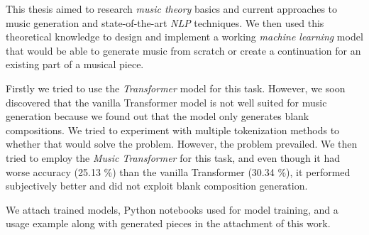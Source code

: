 

This thesis aimed to research \textit{music theory} basics and current approaches to music generation and state-of-the-art \textit{NLP} techniques.
We then used this theoretical knowledge to design and implement a working \textit{machine learning} model that would be able to generate music from scratch or create a continuation for an existing part of a musical piece.

Firstly we tried to use the \textit{Transformer} model for this task.
However, we soon discovered that the vanilla Transformer model is not well suited for music generation because we found out that the model only generates blank compositions.
We tried to experiment with multiple tokenization methods to whether that would solve the problem.
However, the problem prevailed.
We then tried to employ the \textit{Music Transformer} for this task, and even though it had worse accuracy (25.13 \%) than the vanilla Transformer (30.34 \%), it performed subjectively better and did not exploit blank composition generation.

We attach trained models, Python notebooks used for model training, and a usage example along with generated pieces in the attachment of this work.
